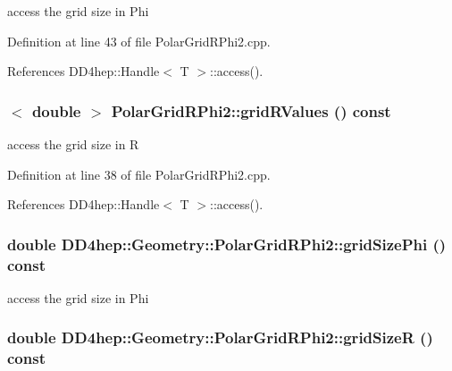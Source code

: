 access the grid size in Phi 

Definition at line 43 of file PolarGridRPhi2.cpp.

References DD4hep::Handle$<$ T $>$::access().\hypertarget{class_d_d4hep_1_1_geometry_1_1_polar_grid_r_phi2_a3231c3be63d9f2c5acc498e99a8b29d9}{
\subsubsection[{gridRValues}]{$<$ double $>$ PolarGridRPhi2::gridRValues () const}}
\label{class_d_d4hep_1_1_geometry_1_1_polar_grid_r_phi2_a3231c3be63d9f2c5acc498e99a8b29d9}


access the grid size in R 

Definition at line 38 of file PolarGridRPhi2.cpp.

References DD4hep::Handle$<$ T $>$::access().\hypertarget{class_d_d4hep_1_1_geometry_1_1_polar_grid_r_phi2_aa57577ab57e185dbee6c82b084bee2e4}{
\subsubsection[{gridSizePhi}]{\setlength{\rightskip}{0pt plus 5cm}double DD4hep::Geometry::PolarGridRPhi2::gridSizePhi () const}}
\label{class_d_d4hep_1_1_geometry_1_1_polar_grid_r_phi2_aa57577ab57e185dbee6c82b084bee2e4}


access the grid size in Phi \hypertarget{class_d_d4hep_1_1_geometry_1_1_polar_grid_r_phi2_a8b208a163e07289eec58c27d9e4bbda5}{
\subsubsection[{gridSizeR}]{\setlength{\rightskip}{0pt plus 5cm}double DD4hep::Geometry::PolarGridRPhi2::gridSizeR () const}}
\label{class_d_d4hep_1_1_geometry_1_1_polar_grid_r_phi2_a8b208a163e07289eec58c27d9e4bbda5}


